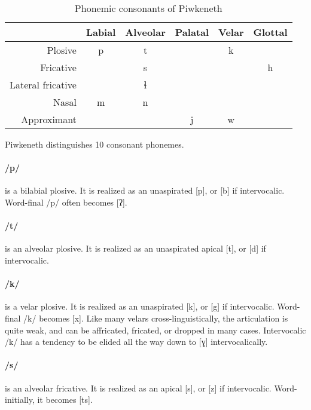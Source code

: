\documentclass[smallroyalvopaper,9pt]{memoir}
\newcommand{\lang}{Piwkeneth}
\newcommand{\bind}{\symbol{"0361}}
\begin{document}
\begin{table}[ht]
    \centering
    \begin{tabular}{rccccc}
        \toprule
        & Labial & Alveolar & Palatal & Velar & Glottal \\
        \midrule
        Plosive & p & t & & k & \\
        Fricative & & s & & & h \\
        Lateral fricative & & ɬ & & & \\
        Nasal & m & n & & & \\
        Approximant & & & j & w & \\
        \bottomrule
    \end{tabular}
    \caption{Phonemic consonants of \lang}
\end{table}


\lang{} distinguishes 10 consonant phonemes.


\paragraph{/p/} is a bilabial plosive. It is realized as an unaspirated [p], or [b] if intervocalic. Word-final /p/ often becomes [ʔ].

\paragraph{/t/} is an alveolar plosive. It is realized as an unaspirated apical [t], or [d] if intervocalic.

\paragraph{/k/} is a velar plosive. It is realized as an unaspirated [k], or [g] if intervocalic. Word-final /k/ becomes [x]. Like many velars cross-linguistically, the articulation is quite weak, and can be affricated, fricated, or dropped in many cases. Intervocalic /k/ has a tendency to be elided all the way down to [ɣ] intervocalically.

\paragraph{/s/} is an alveolar fricative. It is realized as an apical [s], or [z] if intervocalic. Word-initially, it becomes [t\bind{}s].
\end{document}
